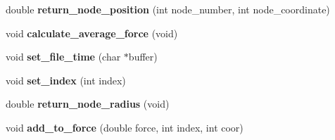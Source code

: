 \begin{DoxyCompactItemize}
\item 
double {\bfseries return\+\_\+node\+\_\+position} (int node\+\_\+number, int node\+\_\+coordinate)\hypertarget{classMembrane_ad732cbc68d1776054f522ab576f487a1}{}\label{classMembrane_ad732cbc68d1776054f522ab576f487a1}

\item 
void {\bfseries calculate\+\_\+average\+\_\+force} (void)\hypertarget{classMembrane_a696ec76d17d33335f2c41aa498485e56}{}\label{classMembrane_a696ec76d17d33335f2c41aa498485e56}

\item 
void {\bfseries set\+\_\+file\+\_\+time} (char $\ast$buffer)\hypertarget{classMembrane_a6b74827fd9dc653001b7cd6315b065a2}{}\label{classMembrane_a6b74827fd9dc653001b7cd6315b065a2}

\item 
void {\bfseries set\+\_\+index} (int index)\hypertarget{classMembrane_a82ba6c57b18e9cc8a8e9cbbbb5ffef08}{}\label{classMembrane_a82ba6c57b18e9cc8a8e9cbbbb5ffef08}

\item 
double {\bfseries return\+\_\+node\+\_\+radius} (void)\hypertarget{classMembrane_a1f9083e074f16cca0c87d0373ac6a450}{}\label{classMembrane_a1f9083e074f16cca0c87d0373ac6a450}

\item 
void {\bfseries add\+\_\+to\+\_\+force} (double force, int index, int coor)\hypertarget{classMembrane_a7524333ddca2039be9931fad57135fad}{}\label{classMembrane_a7524333ddca2039be9931fad57135fad}

\end{DoxyCompactItemize}
